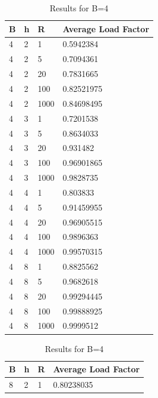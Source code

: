 \documentclass[11pt]{article}
\begin{document}
\begin{table}
\parbox{.45\linewidth}{
\centering
\small
\begin{tabular}{|l|l|l|l|}
\hline
\textbf{B} & \textbf{h} & \textbf{R} & \textbf{Average Load Factor}\\ \hline
4          & 2          & 1        &0.5942384 \\ \hline
4          & 2          & 5        &0.7094361 \\ \hline
4          & 2          & 20        &0.7831665 \\ \hline
4          & 2          & 100        &0.82521975 \\ \hline
4          & 2          & 1000        &0.84698495 \\ \hline
4          & 3          & 1        &0.7201538 \\ \hline
4          & 3          & 5        &0.8634033 \\ \hline
4          & 3          & 20        &0.931482 \\ \hline
4          & 3          & 100        &0.96901865 \\ \hline
4          & 3          & 1000        &0.9828735 \\ \hline
4          & 4          & 1        &0.803833 \\ \hline
4          & 4          & 5        &0.91459955 \\ \hline
4          & 4          & 20        &0.96905515 \\ \hline
4          & 4          & 100        &0.9896363 \\ \hline
4          & 4          & 1000        &0.99570315 \\ \hline
4          & 8          & 1        &0.8825562 \\ \hline
4          & 8          & 5        &0.9682618 \\ \hline
4          & 8          & 20        &0.99294445 \\ \hline
4          & 8          & 100        &0.99888925 \\ \hline
4          & 8          & 1000        &0.9999512 \\ \hline
\end{tabular}
\caption{Results for B=4}
}
\hfill
\parbox{.45\linewidth}{
\centering
\small
\begin{tabular}{|l|l|l|l|}
\hline
\textbf{B} & \textbf{h} & \textbf{R} & \textbf{Average Load Factor} \\ \hline
8          & 2          & 1        &0.80238035 \\ \hline

\end{tabular}}
\end{table}
\end{document}
